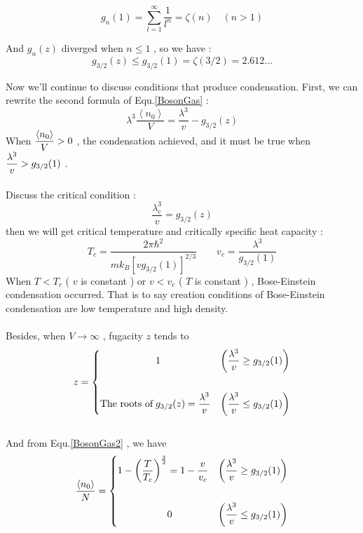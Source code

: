 \documentclass[12pt]{article}
\numberwithin{equation}{section}	 %
\begin{document}
\begin{spacing}{1.5}
\begin{proof*}
\begin{equation}
g_{n}(1) = \sum^{\infty}_{l=1}\frac{1}{l^{n}} = \zeta(n) \quad (n > 1)
\end{equation}

And $g_{n}(z)$ diverged when $n \le 1$ , so we have :
\begin{equation}
g_{3/2}(z) \le g_{3/2}(1) = \zeta(3/2) = 2.612 ...
\end{equation}

Now we'll continue to discuss conditions that produce condensation. First, we can rewrite the second formula of Equ.\ref{BosonGas} :
\begin{equation}
\label{BosonGas2}
\lambda^{3}\frac{\left<n_{0}\right>}{V} = \frac{\lambda^{3}}{v} - g_{3/2}(z)
\end{equation}
When $\displaystyle \frac{\left<n_{0}\right>}{V} > 0$ , the condensation achieved, and it must be true when $\displaystyle \frac{\lambda^{3}}{v} > g_{3/2}(1)$ . \\
~\\
Discuss the critical condition :
\begin{equation}
\frac{\lambda_{c}^{3}}{v} = g_{3/2}(z)
\end{equation}
then we will get critical temperature and critically specific heat capacity :
\begin{equation}
T_{c} = \frac{2\pi\hbar^{2}}{mk_{B} [vg_{3/2}(1)]^{2/3}} \qquad v_{c} = \frac{\lambda^{3}}{g_{3/2}(1)}
\end{equation}
When $T < T_{c}$ ( $v$ is constant ) or $v < v_{c}$ ( $T$ is constant ) , Bose-Einstein condensation occurred. That is to say creation conditions of Bose-Einstein condensation are low temperature and high density. \\
~\\
Besides, when $V \rightarrow \infty$ , fugacity $z$ tends to \\
\begin{equation}
z=\left\{		%
\begin{aligned}
\dps
& 1  \qquad &\left( \frac{\lambda^{3}}{v} \ge g_{3/2}(1) \right) \\
~\\
\text{The roots of} \; & g_{3/2}(z) = \frac{\lambda^{3}}{v} &\left( \frac{\lambda^{3}}{v} \le g_{3/2}(1) \right)
\end{aligned}
\right.	%
\end{equation}
~\\
And from Equ.\ref{BosonGas2} , we have
\begin{equation}
\frac{\left<n_{0}\right>}{N}= \left\{		%
\begin{aligned}
\dps
1 - \left(\frac{T}{T_{c}}\right)^{\frac{3}{2}} &= 1 - \frac{v}{v_{c}} &\left( \frac{\lambda^{3}}{v} \ge g_{3/2}(1) \right) \\
~\\
& 0  \qquad &\left( \frac{\lambda^{3}}{v} \le g_{3/2}(1) \right)
\end{aligned}
\right.	%
\end{equation}


\end{proof*}
\end{spacing}
\end{document}
